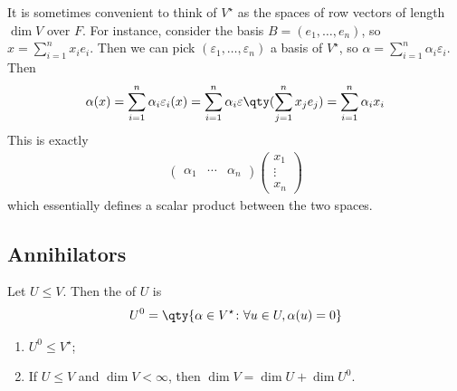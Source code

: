 \begin{remark}
	It is sometimes convenient to think of $V^\star$ as the spaces of row vectors of length $\dim V$ over $F$.
	For instance, consider the basis $B = (e_1, \dots, e_n)$, so $x = \sum_{i=1}^n x_i e_i$.
	Then we can pick $(\varepsilon_1, \dots, \varepsilon_n)$ a basis of $V^\star$, so $\alpha = \sum_{i=1}^n \alpha_i \varepsilon_i$.
	Then
	\begin{align*}
		\alpha(x) = \sum_{i=1}^n \alpha_i \varepsilon_i(x) = \sum_{i=1}^n \alpha_i \varepsilon\qty(\sum_{j=1}^n x_j e_j) = \sum_{i=1}^n \alpha_i x_i
	\end{align*}
	This is exactly
	\begin{align*}
		\begin{pmatrix} \alpha_1 & \cdots & \alpha_n \end{pmatrix} \begin{pmatrix} x_1 \\ \vdots \\ x_n \end{pmatrix}
	\end{align*}
	which essentially defines a scalar product between the two spaces.
\end{remark}

\subsection{Annihilators}
\begin{definition}[Annihilator]
	Let $U \leq V$.
	Then the  of $U$ is
	\begin{align*}
		U^0 = \qty{\alpha \in V^\star \colon \forall u \in U, \alpha(u) = 0}
	\end{align*}
\end{definition}
\begin{lemma}
	\begin{enumerate}
		\item $U^0 \leq V^\star$;
		\item If $U \leq V$ and $\dim V < \infty$, then $\dim V = \dim U + \dim U^0$.
	\end{enumerate}
\end{lemma}

